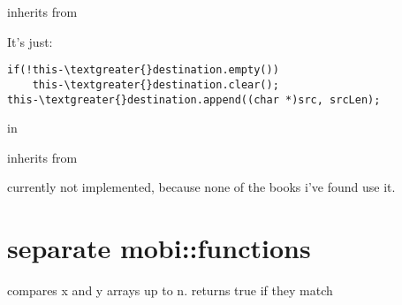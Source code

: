 \documentclass[letterpaper,10pt,english]{sphinxmanual}
\begin{document}
\begin{fulllineitems}
\label{compression:mobi::no_compression}
inherits from {\hyperref[compression:mobi::compression]{}}

It's just:

\begin{Verbatim}[commandchars=\\\{\}]
if(!this-\textgreater{}destination.empty())
    this-\textgreater{}destination.clear();
this-\textgreater{}destination.append((char *)src, srcLen);
\end{Verbatim}

in {\hyperref[compression:compression::uncompress__uint8_tP.s]{}}

\end{fulllineitems}


\begin{fulllineitems}
\label{compression:mobi::hd_compression}
inherits from {\hyperref[compression:mobi::compression]{}}

currently not implemented, because none of the books i've found use it.

\end{fulllineitems}



\section{separate mobi::functions}
\label{functions:separate-mobi-functions}\label{functions::doc}

\begin{fulllineitems}
\label{functions:mobi::strcmp_is_a_worthless_pos__cP.cP.iP}
compares x and y arrays up to n.
returns true if they match

\end{fulllineitems}


\begin{fulllineitems}
\label{functions:bswap__uint16_tR}
\end{fulllineitems}
\end{document}
